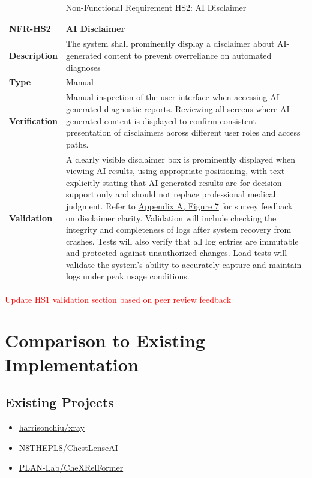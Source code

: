\documentclass[12pt, titlepage]{article}
\begin{document}
\begin{table}[H]
\centering
{}
\begin{tabular}{|p{3.5cm}|p{11.5cm}|}
\hline
\rowcolor{gray!30}
\textbf{NFR-HS2} & \textbf{AI Disclaimer} \\
\hline
\textbf{Description} & The system shall prominently display a disclaimer about AI-generated content to prevent overreliance on automated diagnoses \\
\hline
\textbf{Type} & Manual \\
\hline
\textbf{Verification} & Manual inspection of the user interface when accessing AI-generated diagnostic reports. Reviewing all screens where AI-generated content is displayed to confirm consistent presentation of disclaimers across different user roles and access paths. \\
\hline
\textbf{Validation} & A clearly visible disclaimer box is prominently displayed when viewing AI results, using appropriate positioning, with text explicitly stating that AI-generated results are for decision support only and should not replace professional medical judgment. Refer to \hyperref[appendix:A]{Appendix A, Figure 7} for survey feedback on disclaimer clarity. Validation will include checking the integrity and completeness of logs after system recovery from crashes. Tests will also verify that all log entries are immutable and protected against unauthorized changes. Load tests will validate the system’s ability to accurately capture and maintain logs under peak usage conditions.
\\
\hline
\end{tabular}
\caption{Non-Functional Requirement HS2: AI Disclaimer}
\textcolor{red}{Update HS1 validation section based on peer review feedback}
\end{table}

\clearpage
\newpage
\section{Comparison to Existing Implementation}	

\subsection{Existing Projects}
\begin{itemize}
    \item \href{https://github.com/harrisonchiu/xray/tree/main}{harrisonchiu/xray}
    \item \href{https://github.com/N8THEPL8/ChestLenseAI/tree/main}{N8THEPL8/ChestLenseAI}
    \item \href{https://github.com/PLAN-Lab/CheXRelFormer/tree/main}{PLAN-Lab/CheXRelFormer}
\end{itemize}
\end{document}
